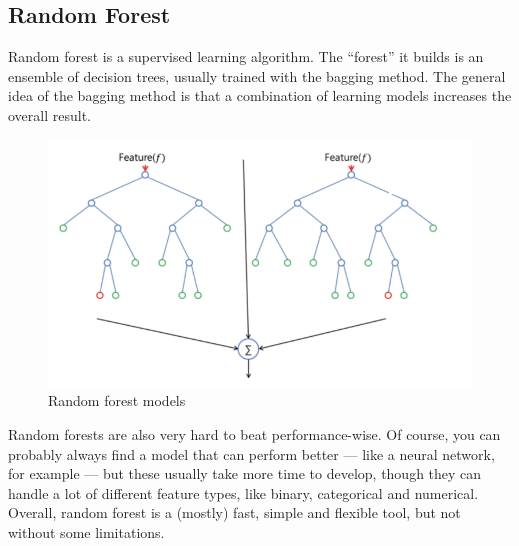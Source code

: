 \documentclass{ieeeojies}
\begin{document}
\subsection{Random Forest}
Random forest is a supervised learning algorithm. The “forest” it builds is an ensemble of decision trees, usually trained with the bagging method. The general idea of the bagging method is that a combination of learning models increases the overall result.
\begin{figure}[H]
  \centering
  \begin{minipage}{0.5\textwidth}
  \centering

  \includegraphics[width=1\textwidth]{bibliography/Figure/RF_work.png}
  \caption{Random forest models}
  \label{fig:1}
  \end{minipage}
\end{figure}
Random forests are also very hard to beat performance-wise. Of course, you can probably always find a model that can perform better — like a neural network, for example — but these usually take more time to develop, though they can handle a lot of different feature types, like binary, categorical and numerical.
Overall, random forest is a (mostly) fast, simple and flexible tool, but not without some limitations.
\end{document}
